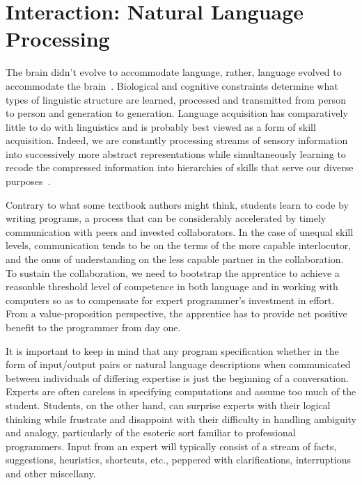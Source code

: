 
\section{Interaction: Natural Language Processing}


The brain didn't evolve to accommodate language, rather, language evolved to accommodate the brain~\cite{ChaterandChristiansenHLB-11}. Biological and cognitive constraints determine what types of linguistic structure are learned, processed and transmitted from person to person and generation to generation. Language acquisition has comparatively little to do with linguistics and is probably best viewed as a form of skill acquisition. Indeed, we are constantly processing streams of sensory information into successively more abstract representations while simultaneously learning to recode the compressed information into hierarchies of skills that serve our diverse purposes~\cite{ChaterandChristiansenCOiBS-18,ChateretalJML-16}.

Contrary to what some textbook authors might think, students learn to code by writing programs, a process that can be considerably accelerated by timely communication with peers and invested collaborators. In the case of unequal skill levels, communication tends to be on the terms of the more capable interlocutor, and the onus of understanding on the less capable partner in the collaboration. To sustain the collaboration, we need to bootstrap the apprentice to achieve a reasonble threshold level of competence in both language and in working with computers so as to compensate for expert programmer's investment in effort. From a value-proposition perspective, the apprentice has to provide net positive benefit to the programmer from day one.

It is important to keep in mind that any program specification whether in the form of input/output pairs or natural language descriptions when communicated between individuals of differing expertise is just the beginning of a conversation. Experts are often careless in specifying computations and assume too much of the student. Students, on the other hand, can surprise experts with their logical thinking while frustrate and disappoint with their difficulty in handling ambiguity and analogy, particularly of the esoteric sort familiar to professional programmers. Input from an expert will typically consist of a stream of facts, suggestions, heuristics, shortcuts, etc., peppered with clarifications, interruptions and other miscellany.

